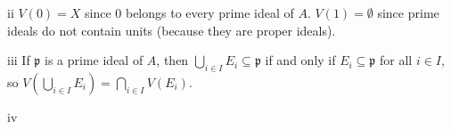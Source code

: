\begin{partsolution}{1}{15}{ii}
\(V(0) = X\) since \(0\) belongs to every prime ideal of \(A\).
\(V(1) = \emptyset\) since prime ideals do not contain units (because they are proper ideals).
\end{partsolution}

\begin{partsolution}{1}{15}{iii}
If \(\mathfrak{p}\) is a prime ideal of \(A\), then \(\bigcup_{i \in I} E_i \subseteq \mathfrak{p}\) if and only if \(E_i \subseteq \mathfrak{p}\) for all \(i \in I\), so \(V\left(\bigcup_{i\in I} E_i\right) = \bigcap_{i\in I} V(E_i)\).
\end{partsolution}

\begin{partsolution}{1}{15}{iv}

\end{partsolution}